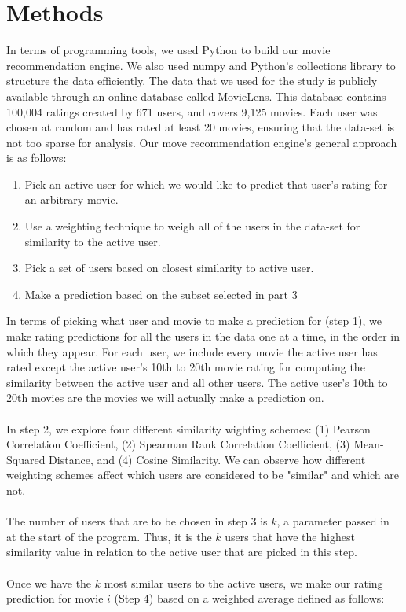 \documentclass[11pt,letterpaper]{article}
\begin{document}
\section{Methods}
In terms of programming tools, we used Python to build our movie recommendation engine. We also used numpy and Python's collections library to structure the data efficiently. The data that we used for the study is publicly available through an online database called MovieLens. This database contains 100,004 ratings created by 671 users, and covers 9,125 movies. Each user was chosen at random and has rated at least 20 movies, ensuring that the data-set is not too sparse for analysis. Our move recommendation engine's general approach is  as follows:
\begin{enumerate}
    \item Pick an active user for which we would like to predict that user’s rating for an arbitrary movie.
    \item Use a weighting technique to weigh all of the users in the data-set for similarity to the active user.
    \item Pick a set of users based on closest similarity to active user.
    \item Make a prediction based on the subset selected in part 3
\end{enumerate}
In terms of picking what user and movie to make a prediction for (step 1), we make rating predictions for all the users in the data one at a time, in the order in which they appear. For each user, we include every movie the active user has rated except the active user’s 10th to 20th movie rating for computing the similarity between the active user and all other users. The active user’s 10th to 20th movies are the movies we will actually make a prediction on.
\\ \\In step 2, we explore four different similarity wighting schemes: (1) Pearson Correlation Coefficient, (2) Spearman Rank Correlation Coefficient, (3) Mean-Squared Distance, and (4) Cosine Similarity. We can observe how different weighting schemes affect which users are considered to be "similar" and which are not.
\\ \\The number of users that are to be chosen in step 3 is $k$, a parameter passed in at the start of the program. Thus, it is the $k$ users that have the highest similarity value in relation to the active user that are picked in this step.
\\ \\Once we have the $k$ most similar users to the active users, we make our rating prediction for movie $i$ (Step 4) based on a weighted average defined as follows:
\end{document}
